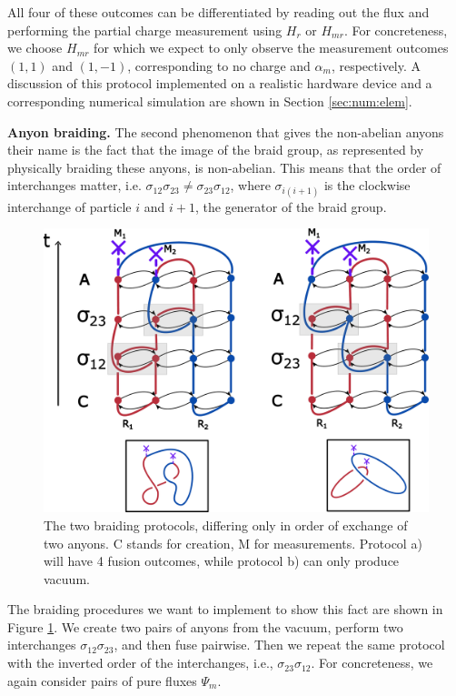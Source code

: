 \documentclass[a4paper,twocolumn,11pt]{quantumarticle}
\begin{document}
All four of these outcomes can be differentiated by reading out the flux and performing the partial charge measurement using $H_r$ or $H_{mr}$. For concreteness, we choose $H_{mr}$ for which we expect to only observe the measurement outcomes $(1,1)$ and $(1,-1)$, corresponding to no charge and $\alpha_m$, respectively. A discussion of this protocol implemented on a realistic hardware device and a corresponding numerical simulation are shown in Section \ref{sec:num:elem}.



\textbf{Anyon braiding.} The second phenomenon that gives the non-abelian anyons their name is the fact that the image of the braid group, as represented by physically braiding these anyons, is non-abelian. 
This means that the order of interchanges matter, i.e. $\sigma_{12}\sigma_{23} \neq \sigma_{23}\sigma_{12}$, where $\sigma_{i(i+1)}$ is the clockwise interchange of particle $i$ and $i+1$, the generator of the braid group.


\begin{figure}
    \centering
    \includegraphics[width=\linewidth]{Figures/fluxBRAID.pdf}
    \caption{The two braiding protocols, differing only in order of exchange of two anyons. C stands for creation, M for measurements. Protocol a) will have 4 fusion outcomes, while protocol b) can only produce vacuum.}
    \label{fig:flux_braid}
\end{figure}

The braiding procedures we want to implement to show this fact are shown in Figure \ref{fig:flux_braid}. We create two pairs of anyons from the vacuum, perform two interchanges $\sigma_{12} \sigma_{23}$, and then fuse pairwise. Then we repeat the same protocol with the inverted order of the interchanges, i.e., $\sigma_{23} \sigma_{12}$. For concreteness, we again consider pairs of pure fluxes $\Psi_m$. 
\end{document}
